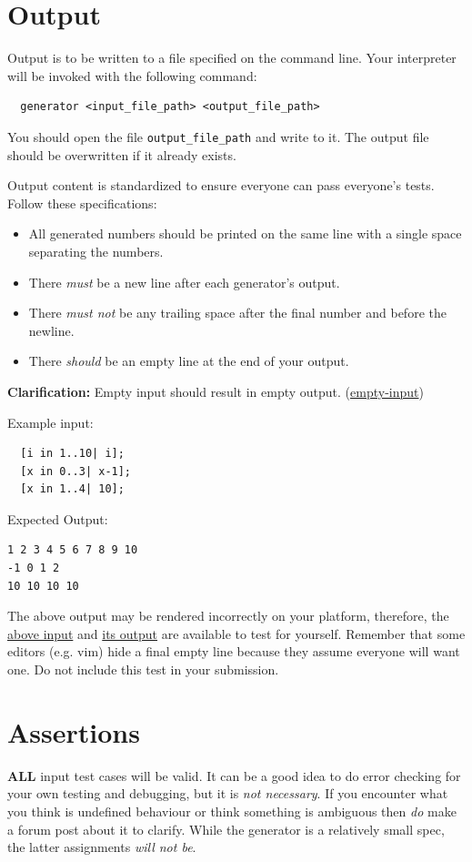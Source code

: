 \documentclass{article}
\newcommand{\code}[1]{\texttt{\textmd{#1}}}
\newcommand{\clarification}[2]{\textbf{Clarification: }#1 (\hyperlink{#2}{#2})}
\begin{document}
\section{Output}
Output is to be written to a file specified on the command line. Your interpreter
will be invoked with the following command:
\begin{lstlisting}
  generator <input_file_path> <output_file_path>
\end{lstlisting}
You should open the file \code{output\_file\_path} and write to it. The output file should be
overwritten if it already exists.

Output content is standardized to ensure everyone can pass everyone's tests. Follow these
specifications:
\begin{itemize}
  \item
    All generated numbers should be printed on the same line with a single space separating the
    numbers.
  \item
    There \textit{must} be a new line after each generator's output.
  \item
    There \textit{must not} be any trailing space after the final number and before the newline.
  \item
    There \textit{should} be an empty line at the end of your output.
\end{itemize}

\clarification{Empty input should result in empty output.}{empty-input}

Example input:
\begin{lstlisting}
  [i in 1..10| i];
  [x in 0..3| x-1];
  [x in 1..4| 10];
\end{lstlisting}

Expected Output:
\begin{lstlisting}
1 2 3 4 5 6 7 8 9 10
-1 0 1 2
10 10 10 10
\end{lstlisting}

The above output may be rendered incorrectly on your platform, therefore, the
\href{https://webdocs.cs.ualberta.ca/\%7Ec415/generator/static/ex.in} {above input} and
\href{https://webdocs.cs.ualberta.ca/\%7Ec415/generator/static/ex.out} {its output} are available
to test for yourself. Remember that some editors (e.g. vim) hide a final empty line because they
assume everyone will want one. Do not include this test in your submission.

\section{Assertions}
\textbf{ALL} input test cases will be valid. It can be a good idea to do error checking for your
own testing and debugging, but it is \textit{not necessary}. If you encounter what you think is
undefined behaviour or think something is ambiguous then \textit{do} make a forum post about it to
clarify. While the generator is a relatively small spec, the latter assignments \textit{will not
be}.
\end{document}
